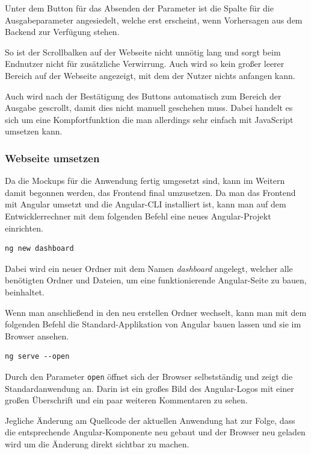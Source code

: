 Unter dem Button für das Absenden der Parameter ist die Spalte für die Ausgabeparameter angesiedelt, welche erst
erscheint, wenn Vorhersagen aus dem Backend zur Verfügung stehen.

So ist der Scrollbalken auf der Webseite nicht unnötig lang und sorgt beim Endnutzer nicht für zusätzliche Verwirrung.
Auch wird so kein großer leerer Bereich auf der Webseite angezeigt, mit dem der Nutzer nichts anfangen kann.

Auch wird nach der Bestätigung des Buttons automatisch zum Bereich der Ausgabe gescrollt, damit dies nicht manuell
geschehen muss. Dabei handelt es sich um eine Kompfortfunktion die man allerdings sehr einfach mit JavaScript umsetzen
kann.

\subsubsection{Webseite umsetzen}
Da die Mockups für die Anwendung fertig umgesetzt sind, kann im Weitern damit begonnen werden, das Frontend final
umzusetzen. Da man das Frontend mit Angular umsetzt und die Angular-CLI installiert ist, kann man auf dem
Entwicklerrechner mit dem folgenden Befehl eine neues Angular-Projekt einrichten.

\begin{lstlisting}[caption=Einrichten eines neuen Angular-Projektes, label=ls:umsetzung_angular]
    ng new dashboard
\end{lstlisting}

Dabei wird ein neuer Ordner mit dem Namen \textit{dashboard} angelegt, welcher alle benötigten Ordner und Dateien, um
eine funktionierende Angular-Seite zu bauen, beinhaltet.

Wenn man anschließend in den neu erstellen Ordner wechselt, kann man mit dem folgenden Befehl die Standard-Applikation
von Angular bauen lassen und sie im Browser ansehen.

\begin{lstlisting}[caption=Bereitstellen der Angular-Webseite, label=ls:umsetzung_angularserve]
    ng serve --open
\end{lstlisting}

Durch den Parameter \texttt{open} öffnet sich der Browser selbstständig und zeigt die Standardanwendung an. Darin ist
ein großes Bild des Angular-Logos mit einer großen Überschrift und ein paar weiteren Kommentaren zu sehen.

Jegliche Änderung am Quellcode der aktuellen Anwendung hat zur Folge, dass die entsprechende Angular-Komponente neu
gebaut und der Browser neu geladen wird um die Änderung direkt sichtbar zu machen.

